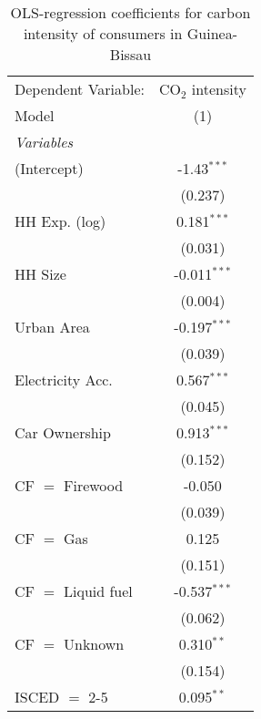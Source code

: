 
\begin{table}[htbp!]
   \centering
   \small
   \begin{adjustbox}{width = 1\textwidth, max height = 0.95\textheight, center}
      \begin{threeparttable}[b]
         \caption{\label{tab:OLS_1_GNB} OLS-regression coefficients for carbon intensity of consumers in Guinea-Bissau}
         \begin{tabular}{lc}
            \tabularnewline \midrule \midrule
            Dependent Variable: & CO$_{2}$ intensity\\  
            Model               & (1)\\  
            \midrule
            \emph{Variables}\\
            (Intercept)         & -1.43$^{***}$\\   
                                & (0.237)\\   
            HH Exp. (log)       & 0.181$^{***}$\\   
                                & (0.031)\\   
            HH Size             & -0.011$^{***}$\\   
                                & (0.004)\\   
            Urban Area          & -0.197$^{***}$\\   
                                & (0.039)\\   
            Electricity Acc.    & 0.567$^{***}$\\   
                                & (0.045)\\   
            Car Ownership       & 0.913$^{***}$\\   
                                & (0.152)\\   
            CF $=$ Firewood     & -0.050\\   
                                & (0.039)\\   
            CF $=$ Gas          & 0.125\\   
                                & (0.151)\\   
            CF $=$ Liquid fuel  & -0.537$^{***}$\\   
                                & (0.062)\\   
            CF $=$ Unknown      & 0.310$^{**}$\\   
                                & (0.154)\\   
            ISCED $=$ 2-5       & 0.095$^{**}$\\   

\end{tabular}
\end{threeparttable}
\end{adjustbox}
\end{table}
